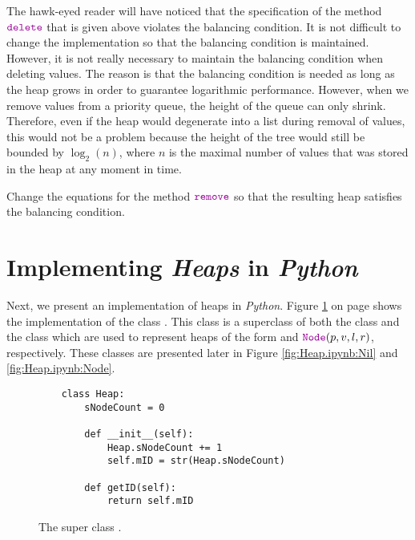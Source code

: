 The hawk-eyed reader will have noticed that the specification of the method $\mytt{delete}$ that is given
above violates the balancing condition.  It is not difficult to change the implementation so that
the balancing condition is maintained.  However, it is not really necessary to maintain the
balancing condition when deleting values.  The reason is that the balancing condition is needed as
long as the heap grows in order to guarantee logarithmic  performance.  However, when we remove
values from a priority queue, the height of the queue can only shrink.  Therefore, even if the heap
would degenerate into a list during removal of values, this would not be a problem because the
height of the tree would still be bounded by $\log_2(n)$, where $n$ is the maximal number of
values that was stored in the heap at any moment in time.

\exercise
Change the equations for the method $\mytt{remove}$ so that the resulting heap satisfies the
balancing condition.



\section[Implementation]{Implementing \textsl{Heaps} in \textsl{Python}}
Next, we present an implementation of heaps in \textsl{Python}.  Figure \ref{fig:Heap.ipynb:Heap} on page
\pageref{fig:Heap.ipynb:Heap} shows the implementation of the class  .  This class is a superclass
of both the class  and the class  which are used to represent heaps of the form
 and $\mytt{Node}(p, v, l, r)$, respectively.  These classes are presented later in Figure
\ref{fig:Heap.ipynb:Nil} and \ref{fig:Heap.ipynb:Node}.


\begin{figure}[!ht]
\centering
\begin{verbatim}
    class Heap:
        sNodeCount = 0
        
        def __init__(self):
            Heap.sNodeCount += 1
            self.mID = str(Heap.sNodeCount)
            
        def getID(self):
            return self.mID                 
\end{verbatim}
\vspace*{-0.3cm}
\caption{The super class .}
\label{fig:Heap.ipynb:Heap}
\end{figure}

